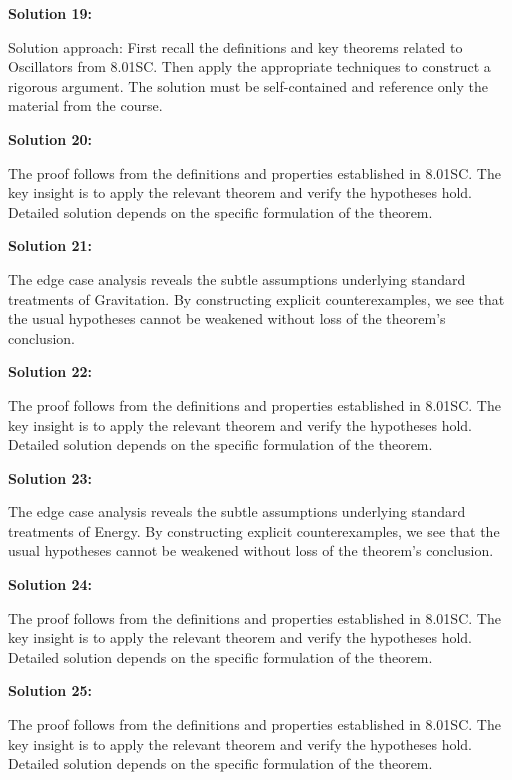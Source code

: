 \documentclass[12pt,a4paper]{exam}
\begin{document}
\vspace{0.5cm}

\textbf{Solution 19:}

Solution approach: First recall the definitions and key theorems related to Oscillators from 8.01SC. Then apply the appropriate techniques to construct a rigorous argument. The solution must be self-contained and reference only the material from the course.

\vspace{0.5cm}

\textbf{Solution 20:}

The proof follows from the definitions and properties established in 8.01SC. The key insight is to apply the relevant theorem and verify the hypotheses hold. Detailed solution depends on the specific formulation of the theorem.

\vspace{0.5cm}

\textbf{Solution 21:}

The edge case analysis reveals the subtle assumptions underlying standard treatments of Gravitation. By constructing explicit counterexamples, we see that the usual hypotheses cannot be weakened without loss of the theorem's conclusion.

\vspace{0.5cm}

\textbf{Solution 22:}

The proof follows from the definitions and properties established in 8.01SC. The key insight is to apply the relevant theorem and verify the hypotheses hold. Detailed solution depends on the specific formulation of the theorem.

\vspace{0.5cm}

\textbf{Solution 23:}

The edge case analysis reveals the subtle assumptions underlying standard treatments of Energy. By constructing explicit counterexamples, we see that the usual hypotheses cannot be weakened without loss of the theorem's conclusion.

\vspace{0.5cm}

\textbf{Solution 24:}

The proof follows from the definitions and properties established in 8.01SC. The key insight is to apply the relevant theorem and verify the hypotheses hold. Detailed solution depends on the specific formulation of the theorem.

\vspace{0.5cm}

\textbf{Solution 25:}

The proof follows from the definitions and properties established in 8.01SC. The key insight is to apply the relevant theorem and verify the hypotheses hold. Detailed solution depends on the specific formulation of the theorem.

\vspace{0.5cm}
\end{document}
